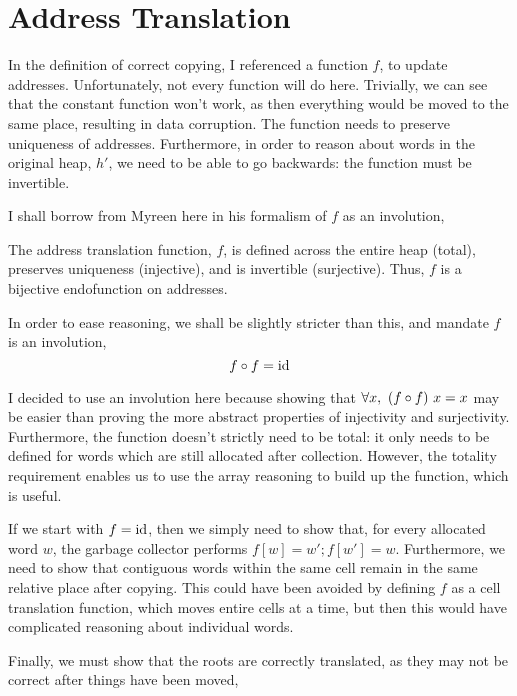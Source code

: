 \section{Address Translation}
\label{sec:copying-address}

In the definition of correct \gls{copying}, I referenced a function
$f$, to update addresses. Unfortunately, not every function will do
here. Trivially, we can see that the constant function won't work, as
then everything would be moved to the same place, resulting in data
corruption. The function needs to preserve uniqueness of
addresses. Furthermore, in order to reason about words in the original
\gls{heap}, $h'$, we need to be able to go backwards: the function
must be invertible.

I shall borrow from Myreen\cite{Myreen10} here in his formalism of $f$
as an involution,

\begin{definition}
  \label{def:c-address-translation-function}
  The address translation function, $f$, is defined across the entire
  heap (total), preserves uniqueness (injective), and is invertible
  (surjective). Thus, $f$ is a bijective endofunction on addresses.

  In order to ease reasoning, we shall be slightly stricter than this,
  and mandate $f$ is an involution, \[f \circ f = \mathrm{id}\]
\end{definition}

I decided to use an involution here because showing that $\forall x,\
(f \circ f)~x = x$ may be easier than proving the more abstract
properties of injectivity and surjectivity. Furthermore, the function
doesn't strictly need to be total: it only needs to be defined for
words which are still allocated after collection. However, the
totality requirement enables us to use the array reasoning to build up
the function, which is useful.

If we start with $f = \mathrm{id}$, then we simply need to show that, for
every allocated word $w$, the \gls{garbage collector} performs $f[w] =
w'; f[w'] = w$. Furthermore, we need to show that contiguous words
within the same \gls{cell} remain in the same relative place after
copying. This could have been avoided by defining $f$ as a cell
translation function, which moves entire cells at a time, but then
this would have complicated reasoning about individual words.

Finally, we must show that the roots are correctly translated, as they
may not be correct after things have been moved,

